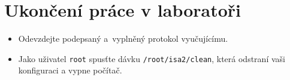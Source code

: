 \documentclass[a4paper,11pt]{article}
\begin{document}
\section{Ukončení práce v laboratoři}
\begin{itemize}
  \item Odevzdejte podepsaný a~vyplněný protokol vyučujícímu. 
  \item Jako uživatel \texttt{root} spusťte dávku {\tt /root/isa2/clean}, která odstraní vaši konfiguraci a vypne počítač.
\end{itemize}
\end{document}

